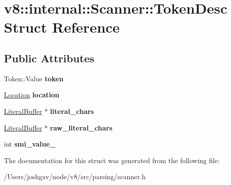 \hypertarget{structv8_1_1internal_1_1_scanner_1_1_token_desc}{}\section{v8\+:\+:internal\+:\+:Scanner\+:\+:Token\+Desc Struct Reference}
\label{structv8_1_1internal_1_1_scanner_1_1_token_desc}
\subsection*{Public Attributes}
\begin{DoxyCompactItemize}
\item 
Token\+::\+Value {\bfseries token}\hypertarget{structv8_1_1internal_1_1_scanner_1_1_token_desc_a108629d9a5e03a5152836cf50e75da34}{}\label{structv8_1_1internal_1_1_scanner_1_1_token_desc_a108629d9a5e03a5152836cf50e75da34}

\item 
\hyperlink{structv8_1_1internal_1_1_scanner_1_1_location}{Location} {\bfseries location}\hypertarget{structv8_1_1internal_1_1_scanner_1_1_token_desc_ab29a8830b54d7ad3f736f434f471901c}{}\label{structv8_1_1internal_1_1_scanner_1_1_token_desc_ab29a8830b54d7ad3f736f434f471901c}

\item 
\hyperlink{classv8_1_1internal_1_1_literal_buffer}{Literal\+Buffer} $\ast$ {\bfseries literal\+\_\+chars}\hypertarget{structv8_1_1internal_1_1_scanner_1_1_token_desc_a65e0275e85f260e03cba711c160a6ff6}{}\label{structv8_1_1internal_1_1_scanner_1_1_token_desc_a65e0275e85f260e03cba711c160a6ff6}

\item 
\hyperlink{classv8_1_1internal_1_1_literal_buffer}{Literal\+Buffer} $\ast$ {\bfseries raw\+\_\+literal\+\_\+chars}\hypertarget{structv8_1_1internal_1_1_scanner_1_1_token_desc_a59d42fe83106792105a328c53731ec75}{}\label{structv8_1_1internal_1_1_scanner_1_1_token_desc_a59d42fe83106792105a328c53731ec75}

\item 
int {\bfseries smi\+\_\+value\+\_\+}\hypertarget{structv8_1_1internal_1_1_scanner_1_1_token_desc_a62ad865c2221744663c8323b88db7c74}{}\label{structv8_1_1internal_1_1_scanner_1_1_token_desc_a62ad865c2221744663c8323b88db7c74}

\end{DoxyCompactItemize}


The documentation for this struct was generated from the following file\+:\begin{DoxyCompactItemize}
\item 
/\+Users/joshgav/node/v8/src/parsing/scanner.\+h\end{DoxyCompactItemize}
